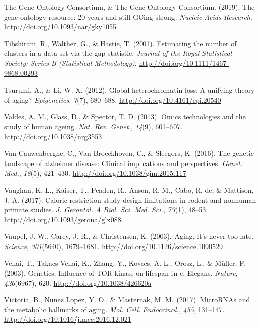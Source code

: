\documentclass[12pt,twoside]{unicam}
\begin{document}
\begin{cslreferences}
\leavevmode\hypertarget{ref-The_Gene_Ontology_Consortium2019}{}%
The Gene Ontology Consortium, \& The Gene Ontology Consortium. (2019). The gene ontology resource: 20 years and still GOing strong. \emph{Nucleic Acids Research}. \url{http://doi.org/10.1093/nar/gky1055}

\leavevmode\hypertarget{ref-Tibshirani2001}{}%
Tibshirani, R., Walther, G., \& Hastie, T. (2001). Estimating the number of clusters in a data set via the gap statistic. \emph{Journal of the Royal Statistical Society: Series B (Statistical Methodology)}. \url{http://doi.org/10.1111/1467-9868.00293}

\leavevmode\hypertarget{ref-Tsurumi2012}{}%
Tsurumi, A., \& Li, W. X. (2012). Global heterochromatin loss: A unifying theory of aging? \emph{Epigenetics}, \emph{7}(7), 680--688. \url{http://doi.org/10.4161/epi.20540}

\leavevmode\hypertarget{ref-Valdes2013}{}%
Valdes, A. M., Glass, D., \& Spector, T. D. (2013). Omics technologies and the study of human ageing. \emph{Nat. Rev. Genet.}, \emph{14}(9), 601--607. \url{http://doi.org/10.1038/nrg3553}

\leavevmode\hypertarget{ref-VanCauwenberghe2016}{}%
Van Cauwenberghe, C., Van Broeckhoven, C., \& Sleegers, K. (2016). The genetic landscape of alzheimer disease: Clinical implications and perspectives. \emph{Genet. Med.}, \emph{18}(5), 421--430. \url{http://doi.org/10.1038/gim.2015.117}

\leavevmode\hypertarget{ref-Vaughan2017}{}%
Vaughan, K. L., Kaiser, T., Peaden, R., Anson, R. M., Cabo, R. de, \& Mattison, J. A. (2017). Caloric restriction study design limitations in rodent and nonhuman primate studies. \emph{J. Gerontol. A Biol. Sci. Med. Sci.}, \emph{73}(1), 48--53. \url{http://doi.org/10.1093/gerona/glx088}

\leavevmode\hypertarget{ref-Vaupel2003}{}%
Vaupel, J. W., Carey, J. R., \& Christensen, K. (2003). Aging. It's never too late. \emph{Science}, \emph{301}(5640), 1679--1681. \url{http://doi.org/10.1126/science.1090529}

\leavevmode\hypertarget{ref-Vellai2003}{}%
Vellai, T., Takacs-Vellai, K., Zhang, Y., Kovacs, A. L., Orosz, L., \& Müller, F. (2003). Genetics: Influence of TOR kinase on lifespan in c. Elegans. \emph{Nature}, \emph{426}(6967), 620. \url{http://doi.org/10.1038/426620a}

\leavevmode\hypertarget{ref-Victoria2017}{}%
Victoria, B., Nunez Lopez, Y. O., \& Masternak, M. M. (2017). MicroRNAs and the metabolic hallmarks of aging. \emph{Mol. Cell. Endocrinol.}, \emph{455}, 131--147. \url{http://doi.org/10.1016/j.mce.2016.12.021}


\end{cslreferences}
\end{document}
